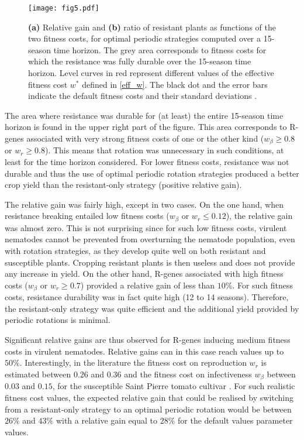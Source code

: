 {{{{\begin{figure}[ht]
  \centering
   \texttt{[image: fig5.pdf]} 
  \caption[(a) Relative gain and (b) ratio of
    resistant plants as functions of the two fitness costs, for
    optimal periodic strategies computed over a 15-season time
    horizon.]{\textbf{(a)} Relative gain and \textbf{(b)} ratio of
    resistant plants as functions of the two fitness costs, for
    optimal periodic strategies computed over a 15-season time
    horizon. The grey area corresponds to fitness costs for which the
    resistance was fully durable over the 15-season time horizon.
    Level curves in red represent different values of the effective
    fitness cost $w^*$ defined in \eqref{eff_w}. The black
    dot and the error bars indicate the default fitness costs and
    their standard deviations \citep{Castagnone-Sereno2007}.}
  \label{fig5}
\end{figure}

The area where resistance was durable for (at least) the entire
15-season time horizon is found in the upper right part of the figure.
This area corresponds to R-genes associated with very strong
fitness costs of one or the other kind ($w_{\beta}\geqslant 0.8$ or
$w_{r}\geqslant 0.8$). This means that rotation was unnecessary in such
conditions, at least for the time horizon considered. For lower
fitness costs, resistance was not durable and thus the use of optimal
periodic rotation strategies produced a better crop yield than the
resistant-only strategy (positive relative gain).

The relative gain was fairly high, except in two cases. On the one
hand, when resistance breaking entailed low fitness costs
($w_{\beta}$ or $w_{r}\leqslant 0.12$), the relative gain was almost
zero. This is not surprising since for such low fitness costs,
virulent nematodes cannot be prevented from overturning the nematode
population, even with rotation strategies, as they develop quite well
on both resistant and susceptible plants. Cropping resistant plants is
then useless and does not provide any increase in yield.  On the other
hand, R-genes associated with high fitness costs
($w_{\beta}$ or $w_{r}\geqslant 0.7$) provided a relative gain of less
than $10\%$. For such fitness costs, resistance durability was in fact
quite high (12 to 14 seasons). Therefore, the resistant-only strategy was quite efficient and
the additional yield provided by periodic rotations is minimal.

Significant relative gains are thus observed for R-genes inducing
medium fitness costs in virulent nematodes. Relative gains can in this
case reach values up to $50\%$. Interestingly, in the literature the
  fitness cost on reproduction $w_{r}$ is estimated between $0.26$ and
  $0.36$ and the fitness cost on infectiveness $w_{\beta}$ between $0.03$
  and $0.15$, for the susceptible Saint Pierre tomato cultivar \citep{Castagnone-Sereno2007}. For
such realistic fitness cost values, the expected relative gain that
could be realised by switching from a resistant-only strategy to an
optimal periodic rotation would be between $26\%$ and
  $43\%$  with a relative
gain equal to $28\%$  for the default values parameter values.

}}}}
